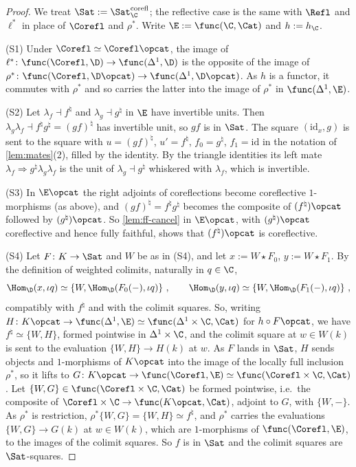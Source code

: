 \begin{proof}
We treat $\Sat := \Sat^{\mathrm{corefl}}_{\C}$; the reflective case is the same with $\Refl$ and $\ell^{*}$ in place of $\Corefl$ and $\rho^{*}$. Write $\E := \func(\C,\Cat)$ and $h := h_{\C}$.

(S1) Under $\Corefl \simeq \Corefl\opcat$, the image of $\ell^{*}\colon \func(\Corefl,\D) \to \func(\Delta^{1},\D)$ is the opposite of the image of $\rho^{*}\colon \func(\Corefl,\D\opcat) \to \func(\Delta^{1},\D\opcat)$. As $h$ is a functor, it commutes with $\rho^{*}$ and so carries the latter into the image of $\rho^{*}$ in $\func(\Delta^{1},\E)$.

(S2) Let $\lambda_{f} \dashv f^{\natural}$ and $\lambda_{g} \dashv g^{\natural}$ in $\E$ have invertible units. Then $\lambda_{g}\lambda_{f} \dashv f^{\natural}g^{\natural} = (gf)^{\natural}$ has invertible unit, so $gf$ is in $\Sat$. The square $(\mathrm{id}_{x},g)$ is sent to the square with $u = (gf)^{\natural}$, $u' = f^{\natural}$, $f_{0} = g^{\natural}$, $f_{1} = \mathrm{id}$ in the notation of \cref{lem:mates}(2), filled by the identity. By the triangle identities its left mate $\lambda_{f} \Rightarrow g^{\natural}\lambda_{g}\lambda_{f}$ is the unit of $\lambda_{g} \dashv g^{\natural}$ whiskered with $\lambda_{f}$, which is invertible.

(S3) In $\E\opcat$ the right adjoints of coreflections become coreflective $1$-morphisms (as above), and $(gf)^{\natural} = f^{\natural}g^{\natural}$ becomes the composite of $(f^{\natural})\opcat$ followed by $(g^{\natural})\opcat$. So \cref{lem:ff-cancel} in $\E\opcat$, with $(g^{\natural})\opcat$ coreflective and hence fully faithful, shows that $(f^{\natural})\opcat$ is coreflective.

(S4) Let $F\colon K \to \Sat$ and $W$ be as in (S4), and let $x := W \star F_{0}$, $y := W \star F_{1}$. By the definition of weighted colimits, naturally in $q \in \C$,
\[
\Hom_{\D}(x,\iota q) \simeq \{W,\Hom_{\D}(F_{0}(-),\iota q)\} \ , \qquad \Hom_{\D}(y,\iota q) \simeq \{W,\Hom_{\D}(F_{1}(-),\iota q)\} \ ,
\]
compatibly with $f^{\natural}$ and with the colimit squares. So, writing $H\colon K\opcat \to \func(\Delta^{1},\E) \simeq \func(\Delta^{1} \times \C,\Cat)$ for $h \circ F\opcat$, we have $f^{\natural} \simeq \{W,H\}$, formed pointwise in $\Delta^{1} \times \C$, and the colimit square at $w \in W(k)$ is sent to the evaluation $\{W,H\} \to H(k)$ at $w$.
As $F$ lands in $\Sat$, $H$ sends objects and $1$-morphisms of $K\opcat$ into the image of the locally full inclusion $\rho^{*}$, so it lifts to $G\colon K\opcat \to \func(\Corefl,\E) \simeq \func(\Corefl \times \C,\Cat)$ \cite[Cor.~2.6.6]{abellangagnahaugseng2024straightening}. Let $\{W,G\} \in \func(\Corefl \times \C,\Cat)$ be formed pointwise, i.e.\ the composite of $\Corefl \times \C \to \func(K\opcat,\Cat)$, adjoint to $G$, with $\{W,-\}$. As $\rho^{*}$ is restriction, $\rho^{*}\{W,G\} = \{W,H\} \simeq f^{\natural}$, and $\rho^{*}$ carries the evaluations $\{W,G\} \to G(k)$ at $w \in W(k)$, which are $1$-morphisms of $\func(\Corefl,\E)$, to the images of the colimit squares. So $f$ is in $\Sat$ and the colimit squares are $\Sat$-squares.
\end{proof}

